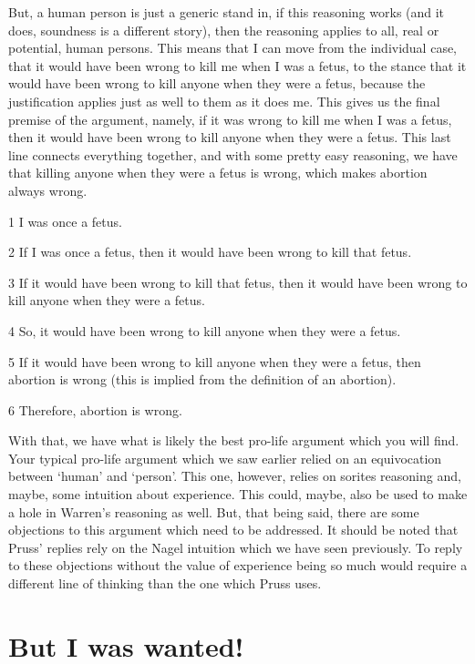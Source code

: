 But, a human person is just a generic stand in, if this reasoning works (and it does, soundness is a different story), then the reasoning applies to all, real or potential, human persons. This means that I can move from the individual case, that it would have been wrong to kill me when I was a fetus, to the stance that it would have been wrong to kill anyone when they were a fetus, because the justification applies just as well to them as it does me. This gives us the final premise of the argument, namely, if it was wrong to kill me when I was a fetus, then it would have been wrong to kill anyone when they were a fetus. This last line connects everything together, and with some pretty easy reasoning, we have that killing anyone when they were a fetus is wrong, which makes abortion always wrong. 
\begin{earg}
    \item[1] I was once a fetus.
    \item[2] If I was once a fetus, then it would have been wrong to kill that fetus.
    \item[3] If it would have been wrong to kill that fetus, then it would have been wrong to kill anyone when they were a fetus. 
    \item[4] So, it would have been wrong to kill anyone when they were a fetus.
    \item[5] If it would have been wrong to kill anyone when they were a fetus, then abortion is wrong (this is implied from the definition of an abortion). 
    \item[6] Therefore, abortion is wrong.
\end{earg}
With that, we have what is likely the best pro-life argument which you will find. Your typical pro-life argument which we saw earlier relied on an equivocation between `human' and `person'. This one, however, relies on sorites reasoning and, maybe, some intuition about experience. This could, maybe, also be used to make a hole in Warren's reasoning as well. But, that being said, there are some objections to this argument which need to be addressed. It should be noted that Pruss' replies rely on the Nagel intuition which we have seen previously. To reply to these objections without the value of experience being so much would require a different line of thinking than the one which Pruss uses. 
\section{But I was wanted!}

